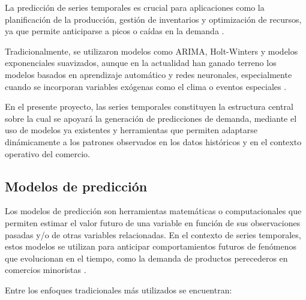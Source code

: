 La predicción de series temporales es crucial para aplicaciones como la planificación de la producción, gestión de inventarios y optimización de recursos, ya que permite anticiparse a picos o caídas en la demanda \parencite{hyndman2018}.

Tradicionalmente, se utilizaron modelos como ARIMA, Holt-Winters y modelos exponenciales suavizados, aunque en la actualidad han ganado terreno los modelos basados en aprendizaje automático y redes neuronales, especialmente cuando se incorporan variables exógenas como el clima o eventos especiales \parencite{bandara2020}.

En el presente proyecto, las series temporales constituyen la estructura central sobre la cual se apoyará la generación de predicciones de demanda, mediante el uso de modelos ya existentes y herramientas que permiten adaptarse dinámicamente a los patrones observados en los datos históricos y en el contexto operativo del comercio.

\subsection{Modelos de predicción}

Los modelos de predicción son herramientas matemáticas o computacionales que permiten estimar el valor futuro de una variable en función de sus observaciones pasadas y/o de otras variables relacionadas. En el contexto de series temporales, estos modelos se utilizan para anticipar comportamientos futuros de fenómenos que evolucionan en el tiempo, como la demanda de productos perecederos en comercios minoristas \parencite{hyndman2018}.

Entre los enfoques tradicionales más utilizados se encuentran:

